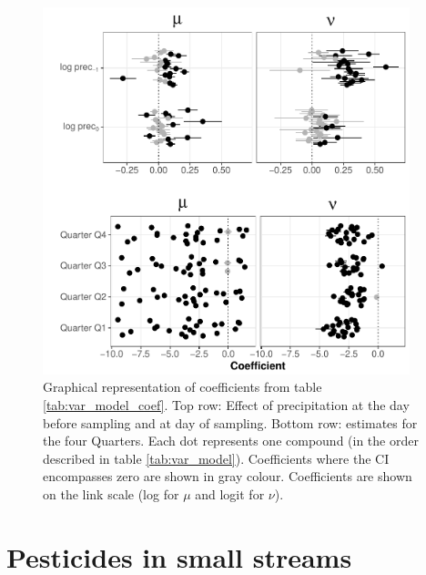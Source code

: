 \begin{figure}
	\centering
	\includegraphics[width = 0.95\textwidth]{appendix/smallstreams/one/coefs}
	\caption[Graphical representation of coefficients from table \ref{tab:var_model_coef}.]{Graphical representation of coefficients from table \ref{tab:var_model_coef}. Top row: Effect of precipitation at the day before sampling and at day of sampling. Bottom row: estimates for the four Quarters. Each dot represents one compound (in the order described in table \ref{tab:var_model}). Coefficients where the CI encompasses zero are shown in gray colour. Coefficients are shown on the link scale (log for $\mu$ and logit for $\nu$).}
	\label{fig:coefs}
\end{figure}
% 


\clearpage
\section{Pesticides in small streams}


